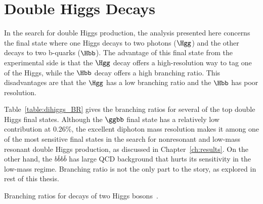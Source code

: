

\section{Double Higgs Decays}

In the search for double Higgs production, the analysis presented here concerns the final state
where one Higgs decays to two photons ($\Hgg$) and the other decays to two b-quarks ($\Hbb$).
The advantage of this final state from the experimental side is that the $\Hgg$ decay
offers a high-resolution way to tag one of the Higgs, while the $\Hbb$ decay offers a high branching
ratio. This disadvantages are that the $\Hgg$ has a low branching ratio and the
$\Hbb$ has poor resolution.

Table~\ref{table:dihiggs_BR} gives the branching ratios for several of the top double Higgs
final states. Although the $\ggbb$ final state has a relatively low contribution at 0.26\%,
the excellent
diphoton mass resolution makes it among one of the most sensitive final states in the search for
nonresonant and low-mass resonant double Higgs production, as discussed in Chapter~\ref{ch:results}.
On the other hand, the $b\bar{b} b\bar{b}$ has large QCD background that hurts its sensitivity
in the low-mass regime. Branching ratio is not the only part to the story, as explored in rest of
this thesis.

\begin{table}[ht]
  \centering
  \renewcommand{\arraystretch}{1.4}
  \caption{Branching ratios for decays of two Higgs bosons~\cite{LHC:SMHiggsBR}.}
  
  \label{table:dihiggs_BR}
\end{table}


